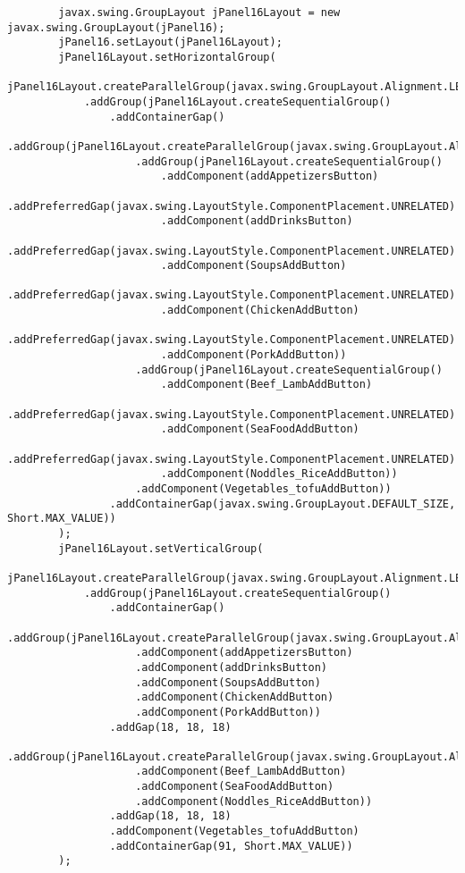 \documentclass[12pt,a4paper]{article}
\begin{document}
\begin{lstlisting}
        javax.swing.GroupLayout jPanel16Layout = new javax.swing.GroupLayout(jPanel16);
        jPanel16.setLayout(jPanel16Layout);
        jPanel16Layout.setHorizontalGroup(
            jPanel16Layout.createParallelGroup(javax.swing.GroupLayout.Alignment.LEADING)
            .addGroup(jPanel16Layout.createSequentialGroup()
                .addContainerGap()
                .addGroup(jPanel16Layout.createParallelGroup(javax.swing.GroupLayout.Alignment.LEADING)
                    .addGroup(jPanel16Layout.createSequentialGroup()
                        .addComponent(addAppetizersButton)
                        .addPreferredGap(javax.swing.LayoutStyle.ComponentPlacement.UNRELATED)
                        .addComponent(addDrinksButton)
                        .addPreferredGap(javax.swing.LayoutStyle.ComponentPlacement.UNRELATED)
                        .addComponent(SoupsAddButton)
                        .addPreferredGap(javax.swing.LayoutStyle.ComponentPlacement.UNRELATED)
                        .addComponent(ChickenAddButton)
                        .addPreferredGap(javax.swing.LayoutStyle.ComponentPlacement.UNRELATED)
                        .addComponent(PorkAddButton))
                    .addGroup(jPanel16Layout.createSequentialGroup()
                        .addComponent(Beef_LambAddButton)
                        .addPreferredGap(javax.swing.LayoutStyle.ComponentPlacement.UNRELATED)
                        .addComponent(SeaFoodAddButton)
                        .addPreferredGap(javax.swing.LayoutStyle.ComponentPlacement.UNRELATED)
                        .addComponent(Noddles_RiceAddButton))
                    .addComponent(Vegetables_tofuAddButton))
                .addContainerGap(javax.swing.GroupLayout.DEFAULT_SIZE, Short.MAX_VALUE))
        );
        jPanel16Layout.setVerticalGroup(
            jPanel16Layout.createParallelGroup(javax.swing.GroupLayout.Alignment.LEADING)
            .addGroup(jPanel16Layout.createSequentialGroup()
                .addContainerGap()
                .addGroup(jPanel16Layout.createParallelGroup(javax.swing.GroupLayout.Alignment.BASELINE)
                    .addComponent(addAppetizersButton)
                    .addComponent(addDrinksButton)
                    .addComponent(SoupsAddButton)
                    .addComponent(ChickenAddButton)
                    .addComponent(PorkAddButton))
                .addGap(18, 18, 18)
                .addGroup(jPanel16Layout.createParallelGroup(javax.swing.GroupLayout.Alignment.BASELINE)
                    .addComponent(Beef_LambAddButton)
                    .addComponent(SeaFoodAddButton)
                    .addComponent(Noddles_RiceAddButton))
                .addGap(18, 18, 18)
                .addComponent(Vegetables_tofuAddButton)
                .addContainerGap(91, Short.MAX_VALUE))
        );


\end{lstlisting}
\end{document}
